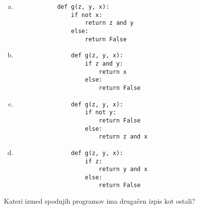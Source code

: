 \documentclass[arhiv, 10pt]{../izpit}
\begin{document}
        \begin{multicols}{2}
        \begin{enumerate}[(a)]
\item 
            \begin{verbatim}
            def g(z, y, x):
                if not x:
                    return z and y
                else:
                    return False
            \end{verbatim}
        
\item 
                \begin{verbatim}
                def g(z, y, x):
                    if z and y:
                        return x
                    else:
                        return False
                \end{verbatim}
            
\item 
                \begin{verbatim}
                def g(z, y, x):
                    if not y:
                        return False
                    else:
                        return z and x
                \end{verbatim}
            
\item 
                \begin{verbatim}
                def g(z, y, x):
                    if z:
                        return y and x
                    else:
                        return False
                \end{verbatim}
            
\end{enumerate}

        \end{multicols}
    
        \naloga*
        
        Kateri izmed spodnjih programov ima drugačen izpis kot ostali?
    
\end{document}
